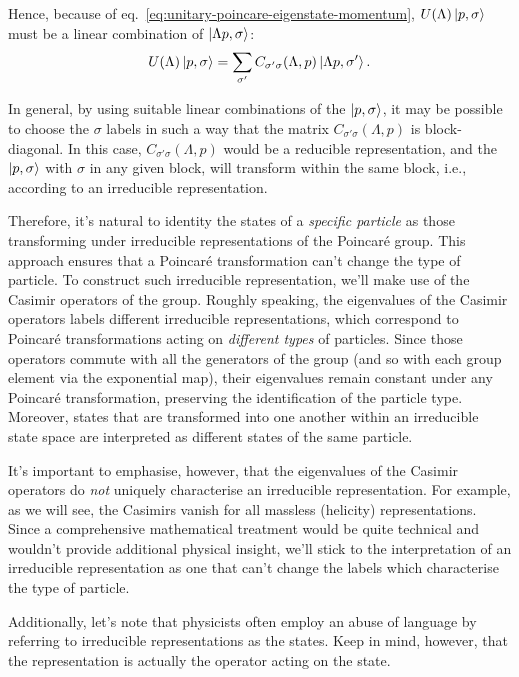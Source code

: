 Hence, because of eq.~\eqref{eq:unitary-poincare-eigenstate-momentum}, $U(\Lambda)\ket{p,\sigma}$ must be a linear combination of $\ket{\Lambda p,\sigma}$:
\begin{equation}\label{eq:temp-1}
    U(\Lambda)\ket{p,\sigma} =  \sum_{\sigma'} C_{\sigma' \sigma} (\Lambda, p) \ket{\Lambda p,\sigma'}.
\end{equation}

In general, by using suitable linear combinations of the $\ket{p,\sigma}$, it may be possible to choose the $\sigma$ labels in such a way that the matrix $C_{\sigma' \sigma} (\Lambda, p)$ is block-diagonal. In this case, $C_{\sigma' \sigma} (\Lambda, p)$ would be a reducible representation, and the $\ket{p,\sigma}$ with $\sigma$ in any given block, will transform within the same block, i.e., according to an irreducible representation. 

Therefore, it's natural to identity the states of a \emph{specific particle} as those transforming under irreducible representations of the Poincaré group. This approach ensures that a Poincaré transformation can't change the type of particle. To construct such irreducible representation, we'll make use of the Casimir operators of the group. Roughly speaking, the eigenvalues of the Casimir operators labels different irreducible representations, which correspond to Poincaré transformations acting on \emph{different types} of particles. Since those operators commute with all the generators of the group (and so with each group element via the exponential map), their eigenvalues remain constant under any Poincaré transformation, preserving the identification of the particle type. Moreover, states that are transformed into one another within an irreducible state space are interpreted as different states of the same particle.

It's important to emphasise, however, that the eigenvalues of the Casimir operators do \emph{not} uniquely characterise an irreducible representation. For example, as we will see, the Casimirs vanish for all massless (helicity) representations. Since a comprehensive mathematical treatment would be quite technical and wouldn't provide additional physical insight, we'll stick to the interpretation of an irreducible representation as one that can't change the labels which characterise the type of particle. 

Additionally, let's note that physicists often employ an abuse of language by referring to irreducible representations as the states. Keep in mind, however, that the representation is actually the operator acting on the state.

